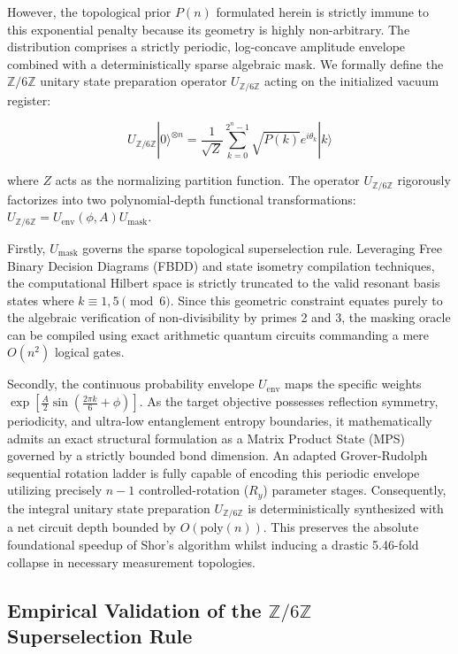 \documentclass[pdflatex,sn-nature]{sn-jnl}
\theoremstyle{thmstyleone}
\theoremstyle{thmstyletwo}
\theoremstyle{thmstylethree}
\begin{document}
However, the topological prior $P(n)$ formulated herein is strictly immune to this exponential penalty because its geometry is highly non-arbitrary. The distribution comprises a strictly periodic, log-concave amplitude envelope combined with a deterministically sparse algebraic mask. We formally define the $\mathbb{Z}/6\mathbb{Z}$ unitary state preparation operator $U_{\mathbb{Z}/6\mathbb{Z}}$ acting on the initialized vacuum register:

\begin{equation}
U_{\mathbb{Z}/6\mathbb{Z}} |0\rangle^{\otimes n} = \frac{1}{\sqrt{Z}} \sum_{k=0}^{2^n-1} \sqrt{P(k)} e^{i\theta_k} |k\rangle
\label{eq:unitary_prep}
\end{equation}

where $Z$ acts as the normalizing partition function. The operator $U_{\mathbb{Z}/6\mathbb{Z}}$ rigorously factorizes into two polynomial-depth functional transformations: $U_{\mathbb{Z}/6\mathbb{Z}} = U_{\text{env}}(\phi, A) U_{\text{mask}}$. 

Firstly, $U_{\text{mask}}$ governs the sparse topological superselection rule. Leveraging Free Binary Decision Diagrams (FBDD) and state isometry compilation techniques, the computational Hilbert space is strictly truncated to the valid resonant basis states where $k \equiv 1,5 \pmod{6}$. Since this geometric constraint equates purely to the algebraic verification of non-divisibility by primes 2 and 3, the masking oracle can be compiled using exact arithmetic quantum circuits commanding a mere $O(n^2)$ logical gates.

Secondly, the continuous probability envelope $U_{\text{env}}$ maps the specific weights $\exp[\frac{A}{2}\sin(\frac{2\pi k}{6} + \phi)]$. As the target objective possesses reflection symmetry, periodicity, and ultra-low entanglement entropy boundaries, it mathematically admits an exact structural formulation as a Matrix Product State (MPS) governed by a strictly bounded bond dimension. An adapted Grover-Rudolph sequential rotation ladder is fully capable of encoding this periodic envelope utilizing precisely $n-1$ controlled-rotation ($R_y$) parameter stages. Consequently, the integral unitary state preparation $U_{\mathbb{Z}/6\mathbb{Z}}$ is deterministically synthesized with a net circuit depth bounded by $O(\text{poly}(n))$. This preserves the absolute foundational speedup of Shor's algorithm whilst inducing a drastic 5.46-fold collapse in necessary measurement topologies.

\subsection*{Empirical Validation of the $\mathbb{Z}/6\mathbb{Z}$ Superselection Rule}
\end{document}
